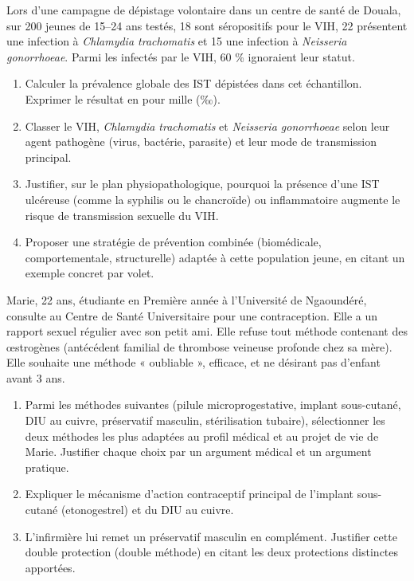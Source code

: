 \documentclass[11pt]{article}
\begin{document}
\begin{exercice}
Lors d'une campagne de dépistage volontaire dans un centre de santé de Douala, sur 200 jeunes de 15--24 ans testés, 18 sont séropositifs pour le VIH, 22 présentent une infection à \textit{Chlamydia trachomatis} et 15 une infection à \textit{Neisseria gonorrhoeae}. Parmi les infectés par le VIH, 60 \% ignoraient leur statut.
\begin{enumerate}
    \item Calculer la prévalence globale des IST dépistées dans cet échantillon. Exprimer le résultat en pour mille (‰).
    \item Classer le VIH, \textit{Chlamydia trachomatis} et \textit{Neisseria gonorrhoeae} selon leur agent pathogène (virus, bactérie, parasite) et leur mode de transmission principal.
    \item Justifier, sur le plan physiopathologique, pourquoi la présence d'une IST ulcéreuse (comme la syphilis ou le chancroïde) ou inflammatoire augmente le risque de transmission sexuelle du VIH.
    \item Proposer une stratégie de prévention combinée (biomédicale, comportementale, structurelle) adaptée à cette population jeune, en citant un exemple concret par volet.
\end{enumerate}
\end{exercice}

\begin{exercice}
Marie, 22 ans, étudiante en Première année à l'Université de Ngaoundéré, consulte au Centre de Santé Universitaire pour une contraception. Elle a un rapport sexuel régulier avec son petit ami. Elle refuse tout méthode contenant des œstrogènes (antécédent familial de thrombose veineuse profonde chez sa mère). Elle souhaite une méthode « oubliable », efficace, et ne désirant pas d'enfant avant 3 ans.
\begin{enumerate}
    \item Parmi les méthodes suivantes (pilule microprogestative, implant sous-cutané, DIU au cuivre, préservatif masculin, stérilisation tubaire), sélectionner les deux méthodes les plus adaptées au profil médical et au projet de vie de Marie. Justifier chaque choix par un argument médical et un argument pratique.
    \item Expliquer le mécanisme d'action contraceptif principal de l'implant sous-cutané (etonogestrel) et du DIU au cuivre.
    \item L'infirmière lui remet un préservatif masculin en complément. Justifier cette double protection (double méthode) en citant les deux protections distinctes apportées.
\end{enumerate}
\end{exercice}
\end{document}
